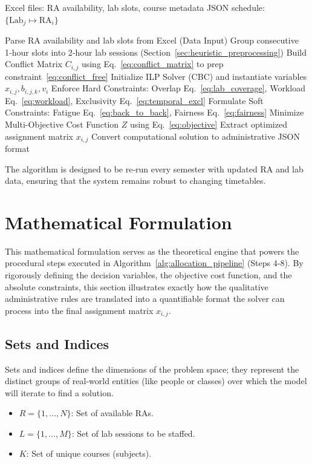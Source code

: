 \documentclass[journal,onecolumn]{IEEEtran}
\begin{document}
\begin{algorithm}[htbp]
\caption{Domain‑Adapted ILP Allocation Pipeline}
\label{alg:allocation_pipeline}
\begin{algorithmic}[1]
\REQUIRE Excel files: RA availability, lab slots, course metadata
\ENSURE JSON schedule: $\{ \text{Lab}_j \mapsto \text{RA}_i \}$

\STATE Parse RA availability and lab slots from Excel (Data Input)
\STATE Group consecutive 1‑hour slots into 2‑hour lab sessions (Section~\ref{sec:heuristic_preprocessing})
\STATE Build Conflict Matrix $C_{i,j}$ using Eq.~\eqref{eq:conflict_matrix} to prep constraint~\eqref{eq:conflict_free}
\STATE Initialize ILP Solver (CBC) and instantiate variables $x_{i,j}, b_{i,j,k}, v_i$
\STATE Enforce Hard Constraints: Overlap Eq.~\eqref{eq:lab_coverage}, Workload Eq.~\eqref{eq:workload}, Exclusivity Eq.~\eqref{eq:temporal_excl}
\STATE Formulate Soft Constraints: Fatigue Eq.~\eqref{eq:back_to_back}, Fairness Eq.~\eqref{eq:fairness}
\STATE Minimize Multi-Objective Cost Function $Z$ using Eq.~\eqref{eq:objective}
\STATE Extract optimized assignment matrix $x_{i,j}$
\STATE Convert computational solution to administrative JSON format
\end{algorithmic}
\end{algorithm}

The algorithm is designed to be re‑run every semester with updated RA and lab data, ensuring that the system remains robust to changing timetables.

\section{Mathematical Formulation}
\label{sec:math_formulation}

This mathematical formulation serves as the theoretical engine that powers the procedural steps executed in Algorithm~\ref{alg:allocation_pipeline} (Steps 4-8). By rigorously defining the decision variables, the objective cost function, and the absolute constraints, this section illustrates exactly how the qualitative administrative rules are translated into a quantifiable format the solver can process into the final assignment matrix $x_{i,j}$.

\subsection{Sets and Indices}
Sets and indices define the dimensions of the problem space; they represent the distinct groups of real-world entities (like people or classes) over which the model will iterate to find a solution.
\begin{itemize}
    \item $R = \{1, ..., N\}$: Set of available RAs.
    \item $L = \{1, ..., M\}$: Set of lab sessions to be staffed.
    \item $K$: Set of unique courses (subjects).
\end{itemize}
\end{document}
